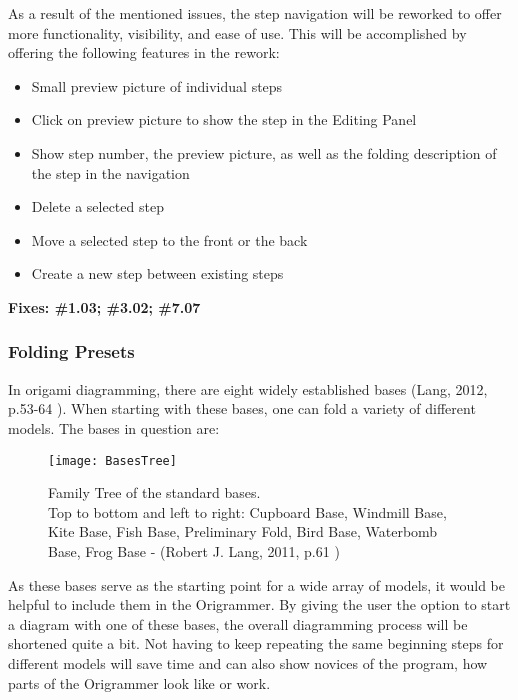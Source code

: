 As a result of the mentioned issues, the step navigation will be reworked to offer more functionality, visibility, and ease of use. This will be accomplished by offering the following features in the rework:
\newpage
\begin{itemize}
\item Small preview picture of individual steps
\item Click on preview picture to show the step in the Editing Panel
\item Show step number, the preview picture, as well as the folding description of the step in the navigation
\item Delete a selected step
\item Move a selected step to the front or the back
\item Create a new step between existing steps
\end{itemize}

\textbf{Fixes: \#1.03; \#3.02; \#7.07}

\subsubsection{Folding Presets}
In origami diagramming, there are eight widely established bases (Lang, 2012, p.53-64 \cite{DesignSecrets}). When starting with these bases, one can fold a variety of different models. The bases in question are:
 
 \begin{figure}[htbp]
	\centering
	\texttt{[image: BasesTree]}
	\caption[Family Tree of the standard bases.\\
	Top to bottom and left to right: Cupboard Base, Windmill Base, Kite Base, Fish Base, Preliminary Fold, Bird Base, Waterbomb Base, Frog Base]{Family Tree of the standard bases.\\
	Top to bottom and left to right: Cupboard Base, Windmill Base, Kite Base, Fish Base, Preliminary Fold, Bird Base, Waterbomb Base, Frog Base - (Robert J. Lang, 2011, p.61 \cite{BaseTree})}
	\label{fig:basesTree}
\end{figure}
\newpage
\noindent As these bases serve as the starting point for a wide array of models, it would be helpful to include them in the Origrammer. By giving the user the option to start a diagram with one of these bases, the overall diagramming process will be shortened quite a bit. Not having to keep repeating the same beginning steps for different models will save time and can also show novices of the program, how parts of the Origrammer look like or work.

